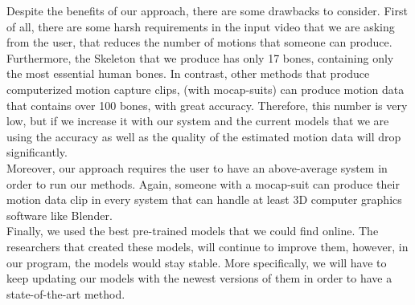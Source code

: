 Despite the benefits of our approach, there are some drawbacks to consider. First of all, there are some harsh requirements in the input video that we are asking from the user, that reduces the number of motions that someone can produce. \\

Furthermore, the Skeleton that we produce has only 17 bones, containing only the most essential human bones. In contrast, other methods that produce computerized motion capture clips, (with mocap-suits) can produce motion data that contains over 100 bones, with great accuracy. Therefore, this number is very low, but if we increase it with our system and the current models that we are using the accuracy as well as the quality of the estimated motion data will drop significantly.\\

Moreover, our approach requires the user to have an above-average system in order to run our methods. Again, someone with a mocap-suit can produce their motion data clip in every system that can handle at least 3D computer graphics software like Blender.\\

Finally, we used the best pre-trained models that we could find online. The researchers that created these models, will continue to improve them, however, in our program, the models would stay stable. More specifically, we will have to keep updating our models with the newest versions of them in order to have a state-of-the-art method.\\